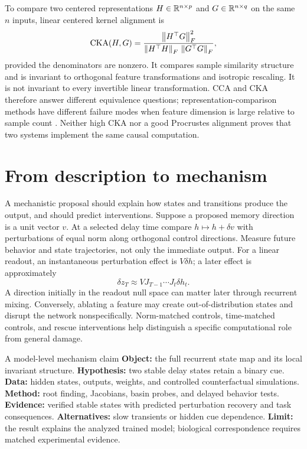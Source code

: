 To compare two centered representations $H\in\mathbb{R}^{n\times p}$ and $G\in\mathbb{R}^{n\times q}$ on the same $n$ inputs, linear centered kernel alignment is
\begin{equation}
 \operatorname{CKA}(H,G)=
 \frac{\left\lVert H^\top G\right\rVert_F^2}
 {\left\lVert H^\top H\right\rVert_F\,\left\lVert G^\top G\right\rVert_F},\label{eq:10-cka}
\end{equation}
provided the denominators are nonzero. It compares sample similarity structure and is invariant to orthogonal feature transformations and isotropic rescaling. It is not invariant to every invertible linear transformation. CCA and CKA therefore answer different equivalence questions; representation-comparison methods have different failure modes when feature dimension is large relative to sample count \citep{app_kornblith2019}. Neither high CKA nor a good Procrustes alignment proves that two systems implement the same causal computation.

\section{From description to mechanism}
A mechanistic proposal should explain how states and transitions produce the output, and should predict interventions. Suppose a proposed memory direction is a unit vector $v$. At a selected delay time compare $h\mapsto h+\delta v$ with perturbations of equal norm along orthogonal control directions. Measure future behavior and state trajectories, not only the immediate output. For a linear readout, an instantaneous perturbation effect is $V\delta h$; a later effect is approximately
\begin{equation}
 \delta z_T\approx VJ_{T-1}\cdots J_t\delta h_t.
\end{equation}
A direction initially in the readout null space can matter later through recurrent mixing. Conversely, ablating a feature may create out-of-distribution states and disrupt the network nonspecifically. Norm-matched controls, time-matched controls, and rescue interventions help distinguish a specific computational role from general damage.

\begin{insight}{A model-level mechanism claim}
\textbf{Object:} the full recurrent state map and its local invariant structure. \textbf{Hypothesis:} two stable delay states retain a binary cue. \textbf{Data:} hidden states, outputs, weights, and controlled counterfactual simulations. \textbf{Method:} root finding, Jacobians, basin probes, and delayed behavior tests. \textbf{Evidence:} verified stable states with predicted perturbation recovery and task consequences. \textbf{Alternatives:} slow transients or hidden cue dependence. \textbf{Limit:} the result explains the analyzed trained model; biological correspondence requires matched experimental evidence.
\end{insight}

